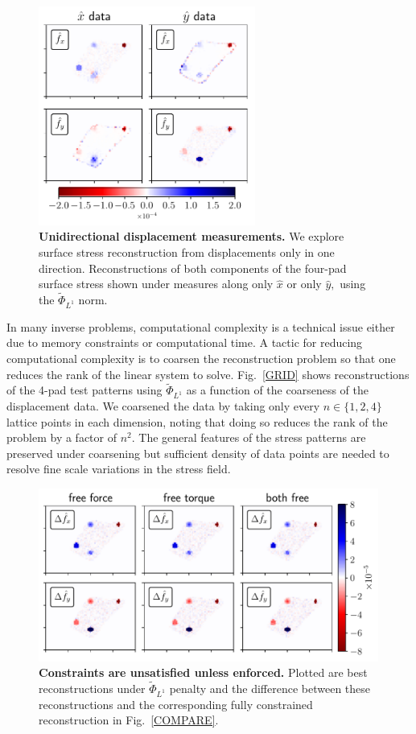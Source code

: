 \documentclass[aps,prl,reprint,groupedaddress,twocolumn]{revtex4-1}
\begin{document}
\begin{figure}
\includegraphics[width=2.8in]{fig5}
\caption{\textbf{Unidirectional displacement measurements.} We explore
  surface stress reconstruction from displacements only in one
  direction. Reconstructions of both components of the four-pad
  surface stress shown under measures along only $\hat{x}$ or only
  $\hat{y},$ using the $\tilde{\Phi}_{L^1}$ norm.}
\label{XYONLY}
\end{figure}

In many inverse problems, computational complexity is a technical
issue either due to memory constraints or computational time. A tactic
for reducing computational complexity is to coarsen the reconstruction
problem so that one reduces the rank of the linear system to solve.
Fig.~\ref{GRID} shows reconstructions of the 4-pad test patterns
using $\tilde{\Phi}_{L^{1}}$ as a function of the coarseness of the
displacement data. We coarsened the data by taking only every
$n\in\{1,2,4\}$ lattice points in each dimension, noting that doing so
reduces the rank of the problem by a factor of $n^2$.  The general
features of the stress patterns are preserved under coarsening but
sufficient density of data points are needed to resolve fine scale
variations in the stress field.


\begin{figure}
\includegraphics[width=4.4in]{fig6_landscape}
\caption{\textbf{Constraints are unsatisfied unless enforced.} Plotted
  are best reconstructions under $\tilde{\Phi}_{L^{1}}$ penalty and
  the difference between these reconstructions and the corresponding
  fully constrained reconstruction in Fig.~\ref{COMPARE}. }
\label{CONSTRAINTS}
\end{figure}
\end{document}
